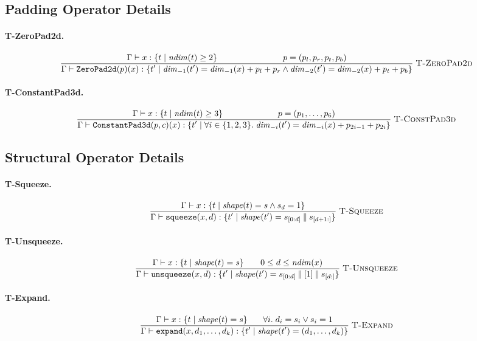 \documentclass[10pt]{article}
\newcommand{\typerule}[3]{%
  \frac{\displaystyle #2}{\displaystyle #3}
  \;\textsc{#1}%
}
\theoremstyle{plain}
\theoremstyle{definition}
\theoremstyle{remark}
\begin{document}
\subsection{Padding Operator Details}

\paragraph{T-ZeroPad2d.}
\[
\typerule{T-ZeroPad2d}{\Gamma \vdash x : \{t \mid \mathit{ndim}(t) \geq 2\}
   \\ p = (p_l, p_r, p_t, p_b)}{\Gamma \vdash \texttt{ZeroPad2d}(p)(x) :
    \{t' \mid \mathit{dim}_{-1}(t') = \mathit{dim}_{-1}(x) + p_l + p_r
    \land \mathit{dim}_{-2}(t') = \mathit{dim}_{-2}(x) + p_t + p_b\}}
\]

\paragraph{T-ConstantPad3d.}
\[
\typerule{T-ConstPad3d}{\Gamma \vdash x : \{t \mid \mathit{ndim}(t) \geq 3\}
   \\ p = (p_1, \ldots, p_6)}{\Gamma \vdash \texttt{ConstantPad3d}(p, c)(x) :
    \{t' \mid \forall i \in \{1,2,3\}.\;
    \mathit{dim}_{-i}(t') = \mathit{dim}_{-i}(x) + p_{2i-1} + p_{2i}\}}
\]

\subsection{Structural Operator Details}

\paragraph{T-Squeeze.}
\[
\typerule{T-Squeeze}{\Gamma \vdash x : \{t \mid \mathit{shape}(t) = s
    \land s_d = 1\}}{\Gamma \vdash \texttt{squeeze}(x, d) :
    \{t' \mid \mathit{shape}(t') = s_{[0:d]} \mathbin\| s_{[d+1:]}\}}
\]

\paragraph{T-Unsqueeze.}
\[
\typerule{T-Unsqueeze}{\Gamma \vdash x : \{t \mid \mathit{shape}(t) = s\}
   \\ 0 \leq d \leq \mathit{ndim}(x)}{\Gamma \vdash \texttt{unsqueeze}(x, d) :
    \{t' \mid \mathit{shape}(t') = s_{[0:d]} \mathbin\| [1] \mathbin\| s_{[d:]}\}}
\]

\paragraph{T-Expand.}
\[
\typerule{T-Expand}{\Gamma \vdash x : \{t \mid \mathit{shape}(t) = s\}
   \\ \forall i.\; d_i = s_i \lor s_i = 1}{\Gamma \vdash \texttt{expand}(x, d_1, \ldots, d_k) :
    \{t' \mid \mathit{shape}(t') = (d_1, \ldots, d_k)\}}
\]
\end{document}
